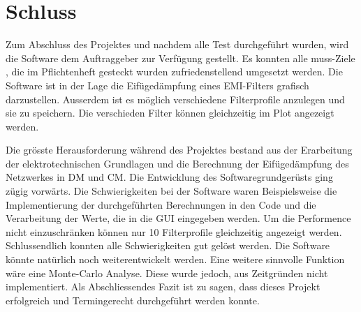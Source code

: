 \section{Schluss} \label{sec:schluss}
Zum Abschluss des Projektes und nachdem alle Test durchgeführt wurden, wird die Software dem Auftraggeber zur Verfügung gestellt. Es konnten alle muss-Ziele , die im Pflichtenheft gesteckt wurden zufriedenstellend umgesetzt werden. Die Software ist in der Lage die Eifügedämpfung eines EMI-Filters grafisch darzustellen. Ausserdem ist es möglich verschiedene Filterprofile anzulegen und sie zu speichern. Die verschieden Filter können gleichzeitig im Plot angezeigt werden. 

Die grösste Herausforderung während des Projektes bestand aus der Erarbeitung der elektrotechnischen Grundlagen und die Berechnung der Eifügedämpfung des Netzwerkes in DM und CM. Die Entwicklung des Softwaregrundgerüsts ging zügig vorwärts. Die Schwierigkeiten bei der Software waren Beispielsweise die Implementierung der durchgeführten Berechnungen in den Code und die Verarbeitung der Werte, die in die GUI eingegeben werden. Um die Performence nicht einzuschränken können nur 10 Filterprofile gleichzeitig angezeigt werden.
Schlussendlich konnten alle Schwierigkeiten gut gelöst werden. Die Software könnte natürlich noch weiterentwickelt werden.  Eine weitere sinnvolle Funktion wäre eine Monte-Carlo Analyse. Diese wurde jedoch, aus Zeitgründen nicht implementiert. Als Abschliessendes Fazit ist zu sagen, dass dieses Projekt erfolgreich und Termingerecht durchgeführt werden konnte. 
